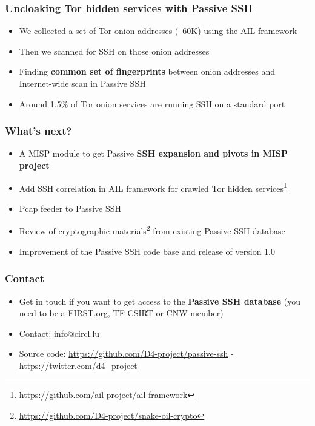 \documentclass{beamer}
\begin{document}
\begin{frame}
        \frametitle{Uncloaking Tor hidden services with Passive SSH}
        \begin{itemize}
                \item We collected a set of Tor onion addresses (~60K) using the AIL framework
                \item Then we scanned for SSH on those onion addresses
                \item Finding {\bf common set of fingerprints} between onion addresses and Internet-wide scan in Passive SSH
                \item Around 1.5\% of Tor onion services are running SSH on a standard port
        \end{itemize}
\end{frame}

\begin{frame}
        \frametitle{What's next?}
        \begin{itemize}
               \item A MISP module to get Passive {\bf SSH expansion and pivots in MISP project}
               \item Add SSH correlation in AIL framework for crawled Tor hidden services\footnote{\url{https://github.com/ail-project/ail-framework}}
               \item Pcap feeder to Passive SSH
               \item Review of cryptographic materials\footnote{\url{https://github.com/D4-project/snake-oil-crypto}} from existing Passive SSH database
               \item Improvement of the Passive SSH code base and release of version 1.0
        \end{itemize}
\end{frame}

\begin{frame}
\frametitle{Contact}
\begin{itemize}
        \item Get in touch if you want to get access to the {\bf Passive SSH database} (you need to be a FIRST.org, TF-CSIRT or CNW member)
\item Contact: info@circl.lu
\item Source code: \url{https://github.com/D4-project/passive-ssh} -  \url{https://twitter.com/d4_project}
\end{itemize}
\end{frame}
\end{document}
